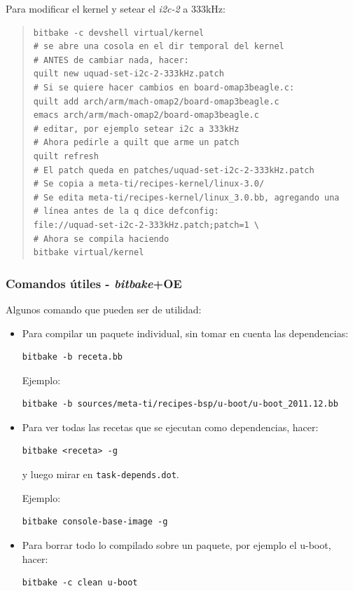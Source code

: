 \documentclass[main]{subfiles}
\begin{document}
Para modificar el kernel y setear el \textit{i2c-2} a 333kHz:

\begin{quote}
\begin{verbatim}
bitbake -c devshell virtual/kernel
# se abre una cosola en el dir temporal del kernel
# ANTES de cambiar nada, hacer:
quilt new uquad-set-i2c-2-333kHz.patch
# Si se quiere hacer cambios en board-omap3beagle.c:
quilt add arch/arm/mach-omap2/board-omap3beagle.c
emacs arch/arm/mach-omap2/board-omap3beagle.c
# editar, por ejemplo setear i2c a 333kHz
# Ahora pedirle a quilt que arme un patch
quilt refresh
# El patch queda en patches/uquad-set-i2c-2-333kHz.patch
# Se copia a meta-ti/recipes-kernel/linux-3.0/
# Se edita meta-ti/recipes-kernel/linux_3.0.bb, agregando una
# línea antes de la q dice defconfig:
file://uquad-set-i2c-2-333kHz.patch;patch=1 \
# Ahora se compila haciendo
bitbake virtual/kernel
\end{verbatim}
\end{quote}

\subsubsection{Comandos útiles - \textit{bitbake}+OE}
\label{sec:codigo:comandos-bitbake-oe}

Algunos comando que pueden ser de utilidad:

\begin{itemize}
\item Para compilar un paquete individual, sin tomar en cuenta las dependencias:
\begin{verbatim}
bitbake -b receta.bb
\end{verbatim}
Ejemplo:
\begin{verbatim}
bitbake -b sources/meta-ti/recipes-bsp/u-boot/u-boot_2011.12.bb
\end{verbatim}
\item Para ver todas las recetas que se ejecutan como dependencias, hacer:
\begin{verbatim}
bitbake <receta> -g
\end{verbatim}
y luego mirar en \verb+task-depends.dot+.

Ejemplo:
\begin{verbatim}
bitbake console-base-image -g
\end{verbatim}
\item Para borrar todo lo compilado sobre un paquete, por ejemplo el u-boot, hacer:
\begin{verbatim}
bitbake -c clean u-boot
\end{verbatim}
\end{itemize}
\end{document}
